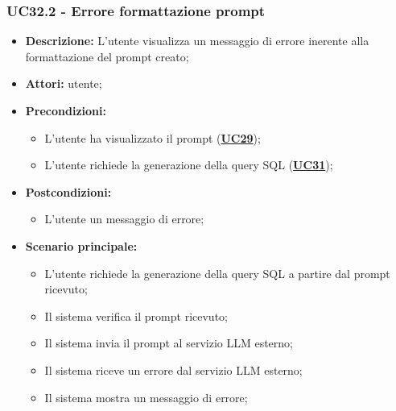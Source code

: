 \subsubsection{UC32.2 - Errore formattazione prompt}
\label{sec:UC32.2}
\begin{itemize}
	\item \textbf{Descrizione:} L'utente visualizza un messaggio di errore inerente alla formattazione del prompt creato;
	\item \textbf{Attori:} utente;
	\item \textbf{Precondizioni:} 
	\begin{itemize}
		\item L'utente ha visualizzato il prompt (\hyperref[sec:UC29]{\textbf{UC29}});
		\item L'utente richiede la generazione della query SQL (\hyperref[sec:UC31]{\textbf{UC31}});
	\end{itemize}
	\item \textbf{Postcondizioni:} 
	\begin{itemize}
		\item L'utente un messaggio di errore;
	\end{itemize}
	\item \textbf{Scenario principale:}
	\begin{itemize}
		\item L'utente richiede la generazione della query SQL a partire dal prompt ricevuto;
		\item Il sistema verifica il prompt ricevuto;
		\item Il sistema invia il prompt al servizio LLM esterno;
		\item Il sistema riceve un errore dal servizio LLM esterno;
		\item Il sistema mostra un messaggio di errore;
	\end{itemize}
\end{itemize}


